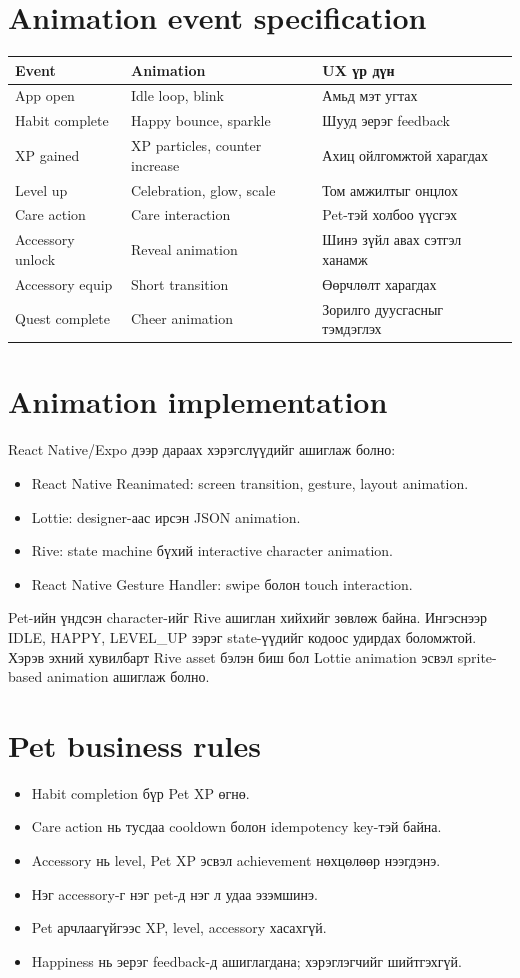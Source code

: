 \documentclass[12pt,a4paper,oneside]{report}
\begin{document}
\section{Animation event specification}
\begin{longtable}{p{}p{}p{}}
\toprule
\textbf{Event} & \textbf{Animation} & \textbf{UX үр дүн}\\
\midrule
App open & Idle loop, blink & Амьд мэт угтах\\
Habit complete & Happy bounce, sparkle & Шууд эерэг feedback\\
XP gained & XP particles, counter increase & Ахиц ойлгомжтой харагдах\\
Level up & Celebration, glow, scale & Том амжилтыг онцлох\\
Care action & Care interaction & Pet-тэй холбоо үүсгэх\\
Accessory unlock & Reveal animation & Шинэ зүйл авах сэтгэл ханамж\\
Accessory equip & Short transition & Өөрчлөлт харагдах\\
Quest complete & Cheer animation & Зорилго дуусгасныг тэмдэглэх\\
\bottomrule
\end{longtable}

\section{Animation implementation}
React Native/Expo дээр дараах хэрэгслүүдийг ашиглаж болно:
\begin{itemize}
  \item React Native Reanimated: screen transition, gesture, layout animation.
  \item Lottie: designer-аас ирсэн JSON animation.
  \item Rive: state machine бүхий interactive character animation.
  \item React Native Gesture Handler: swipe болон touch interaction.
\end{itemize}
Pet-ийн үндсэн character-ийг Rive ашиглан хийхийг зөвлөж байна. Ингэснээр IDLE, HAPPY, LEVEL\_UP зэрэг state-үүдийг кодоос удирдах боломжтой. Хэрэв эхний хувилбарт Rive asset бэлэн биш бол Lottie animation эсвэл sprite-based animation ашиглаж болно.

\section{Pet business rules}
\begin{itemize}
  \item Habit completion бүр Pet XP өгнө.
  \item Care action нь тусдаа cooldown болон idempotency key-тэй байна.
  \item Accessory нь level, Pet XP эсвэл achievement нөхцөлөөр нээгдэнэ.
  \item Нэг accessory-г нэг pet-д нэг л удаа эзэмшинэ.
  \item Pet арчлаагүйгээс XP, level, accessory хасахгүй.
  \item Happiness нь эерэг feedback-д ашиглагдана; хэрэглэгчийг шийтгэхгүй.
\end{itemize}
\end{document}
